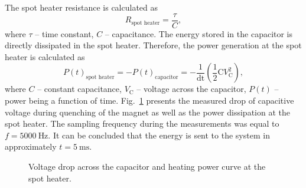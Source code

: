 The spot heater resistance is calculated as
\begin{equation}
    R_\text{spot heater} = \frac{\tau}{C},
\end{equation}
where $\tau$ -- time constant, $C$ -- capacitance. The energy stored in the capacitor is directly dissipated in the spot heater. Therefore, the power generation at the spot heater is calculated as
\begin{equation}
    P(t)_\text{spot heater} = -P(t)_\text{capacitor} = -\frac{1}{\text{dt}} (\frac{1}{2} \text{C}V_\text{C}^2),
\end{equation}
where $C$ -- constant capacitance, $V_\text{C}$ -- voltage across the capacitor, $P(t)$ -- power being a function of time. Fig.~\ref{fig:capacitor_discharge} presents the measured drop of capacitive voltage during quenching of the magnet as well as the power dissipation at the spot heater. The sampling frequency during the measurements was equal to $f=5000~\text{Hz}$. It can be concluded that the energy is sent to the system in approximately $t=5~\text{ms}$.

\begin{figure}[H]
\centering
{}
\caption{Voltage drop across the capacitor and heating power curve at the spot heater.}
\label{fig:capacitor_discharge}
\end{figure}

